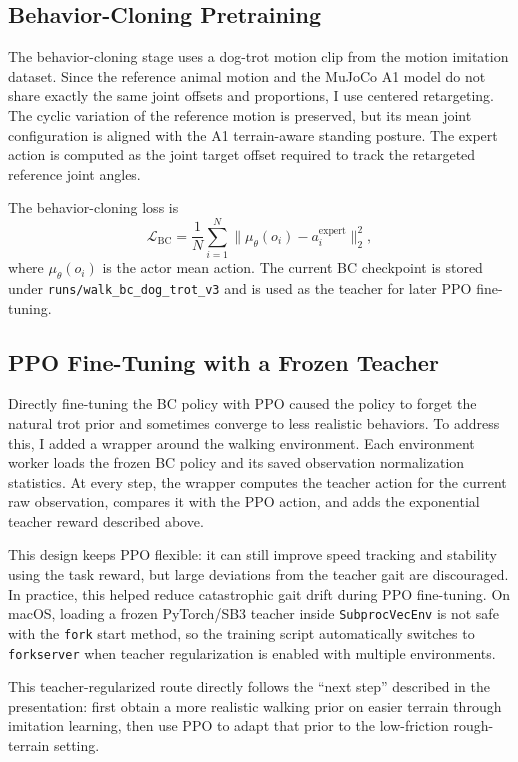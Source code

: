 \documentclass[conference]{IEEEtran}
\begin{document}
\subsection{Behavior-Cloning Pretraining}
The behavior-cloning stage uses a dog-trot motion clip from the motion imitation dataset. Since the reference animal motion and the MuJoCo A1 model do not share exactly the same joint offsets and proportions, I use centered retargeting. The cyclic variation of the reference motion is preserved, but its mean joint configuration is aligned with the A1 terrain-aware standing posture. The expert action is computed as the joint target offset required to track the retargeted reference joint angles.

The behavior-cloning loss is
\begin{equation}
\mathcal{L}_{\mathrm{BC}} =
\frac{1}{N}\sum_{i=1}^{N}
\|\mu_\theta(o_i)-a^{\mathrm{expert}}_i\|_2^2,
\end{equation}
where $\mu_\theta(o_i)$ is the actor mean action. The current BC checkpoint is stored under \verb|runs/walk_bc_dog_trot_v3| and is used as the teacher for later PPO fine-tuning.

\subsection{PPO Fine-Tuning with a Frozen Teacher}
Directly fine-tuning the BC policy with PPO caused the policy to forget the natural trot prior and sometimes converge to less realistic behaviors. To address this, I added a wrapper around the walking environment. Each environment worker loads the frozen BC policy and its saved observation normalization statistics. At every step, the wrapper computes the teacher action for the current raw observation, compares it with the PPO action, and adds the exponential teacher reward described above.

This design keeps PPO flexible: it can still improve speed tracking and stability using the task reward, but large deviations from the teacher gait are discouraged. In practice, this helped reduce catastrophic gait drift during PPO fine-tuning. On macOS, loading a frozen PyTorch/SB3 teacher inside \verb|SubprocVecEnv| is not safe with the \verb|fork| start method, so the training script automatically switches to \verb|forkserver| when teacher regularization is enabled with multiple environments.

This teacher-regularized route directly follows the ``next step'' described in the presentation: first obtain a more realistic walking prior on easier terrain through imitation learning, then use PPO to adapt that prior to the low-friction rough-terrain setting.
\end{document}
